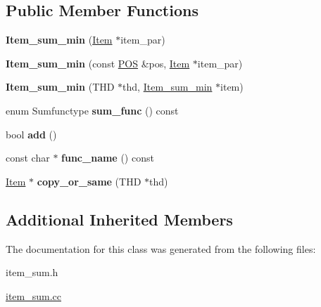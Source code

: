 \subsection*{Public Member Functions}
\begin{DoxyCompactItemize}
\item 
\mbox{\label{classItem__sum__min_a2269b90f878f3ecece5e0d1de7c69ed7}} 
{\bfseries Item\+\_\+sum\+\_\+min} (\mbox{\hyperlink{classItem}{Item}} $\ast$item\+\_\+par)
\item 
\mbox{\label{classItem__sum__min_a864ad190330e90c30b510baccbcf1d85}} 
{\bfseries Item\+\_\+sum\+\_\+min} (const \mbox{\hyperlink{structYYLTYPE}{P\+OS}} \&pos, \mbox{\hyperlink{classItem}{Item}} $\ast$item\+\_\+par)
\item 
\mbox{\label{classItem__sum__min_af53d594b717b01ad20c416ec4e490463}} 
{\bfseries Item\+\_\+sum\+\_\+min} (T\+HD $\ast$thd, \mbox{\hyperlink{classItem__sum__min}{Item\+\_\+sum\+\_\+min}} $\ast$item)
\item 
\mbox{\label{classItem__sum__min_ad8d66e8975ce2032fae8ba4d9c8e5a90}} 
enum Sumfunctype {\bfseries sum\+\_\+func} () const
\item 
\mbox{\label{classItem__sum__min_af158e5ed1c24a5cf525387c009d8b968}} 
bool {\bfseries add} ()
\item 
\mbox{\label{classItem__sum__min_aef605777883dca4e43eafdcd63ca79b9}} 
const char $\ast$ {\bfseries func\+\_\+name} () const
\item 
\mbox{\label{classItem__sum__min_ab68ff56ddd03440e230c52977855f641}} 
\mbox{\hyperlink{classItem}{Item}} $\ast$ {\bfseries copy\+\_\+or\+\_\+same} (T\+HD $\ast$thd)
\end{DoxyCompactItemize}
\subsection*{Additional Inherited Members}


The documentation for this class was generated from the following files\+:\begin{DoxyCompactItemize}
\item 
item\+\_\+sum.\+h\item 
\mbox{\hyperlink{item__sum_8cc}{item\+\_\+sum.\+cc}}\end{DoxyCompactItemize}
